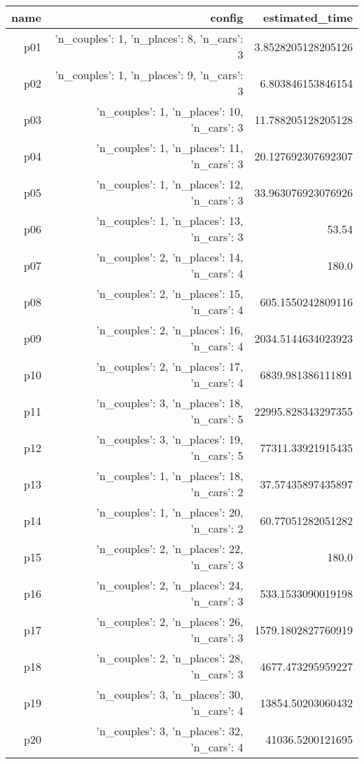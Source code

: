 \documentclass{article}
\begin{document}
                            \begin{center}
                            \scriptsize
                            \begin{tabular}{r|r|r}
                            name & config & estimated\_time\\\midrule
                              p01&{'n\_couples': 1, 'n\_places': 8, 'n\_cars': 3}&3.8528205128205126\\
  p02&{'n\_couples': 1, 'n\_places': 9, 'n\_cars': 3}&6.803846153846154\\
  p03&{'n\_couples': 1, 'n\_places': 10, 'n\_cars': 3}&11.788205128205128\\
  p04&{'n\_couples': 1, 'n\_places': 11, 'n\_cars': 3}&20.127692307692307\\
  p05&{'n\_couples': 1, 'n\_places': 12, 'n\_cars': 3}&33.963076923076926\\
  p06&{'n\_couples': 1, 'n\_places': 13, 'n\_cars': 3}&53.54\\
  p07&{'n\_couples': 2, 'n\_places': 14, 'n\_cars': 4}&180.0\\
  p08&{'n\_couples': 2, 'n\_places': 15, 'n\_cars': 4}&605.1550242809116\\
  p09&{'n\_couples': 2, 'n\_places': 16, 'n\_cars': 4}&2034.5144634023923\\
  p10&{'n\_couples': 2, 'n\_places': 17, 'n\_cars': 4}&6839.981386111891\\
  p11&{'n\_couples': 3, 'n\_places': 18, 'n\_cars': 5}&22995.828343297355\\
  p12&{'n\_couples': 3, 'n\_places': 19, 'n\_cars': 5}&77311.33921915435\\
  p13&{'n\_couples': 1, 'n\_places': 18, 'n\_cars': 2}&37.57435897435897\\
  p14&{'n\_couples': 1, 'n\_places': 20, 'n\_cars': 2}&60.77051282051282\\
  p15&{'n\_couples': 2, 'n\_places': 22, 'n\_cars': 3}&180.0\\
  p16&{'n\_couples': 2, 'n\_places': 24, 'n\_cars': 3}&533.1533090019198\\
  p17&{'n\_couples': 2, 'n\_places': 26, 'n\_cars': 3}&1579.1802827760919\\
  p18&{'n\_couples': 2, 'n\_places': 28, 'n\_cars': 3}&4677.473295959227\\
  p19&{'n\_couples': 3, 'n\_places': 30, 'n\_cars': 4}&13854.50203060432\\
  p20&{'n\_couples': 3, 'n\_places': 32, 'n\_cars': 4}&41036.5200121695\\

\end{tabular}
\end{center}
\end{document}
